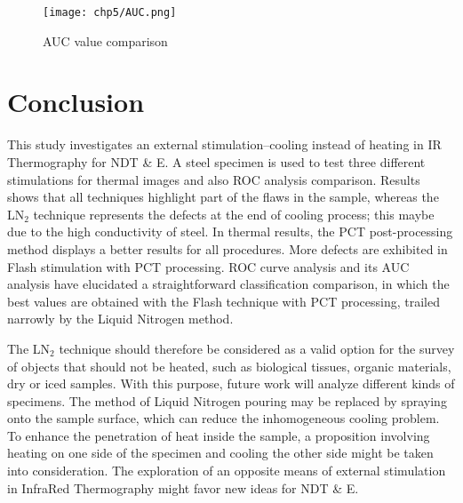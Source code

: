               
\begin{figure}[htpb]
   \centering
   \texttt{[image: chp5/AUC.png]}
   \caption{AUC value comparison}
   \label{fig_auc}
\end{figure}




\section{Conclusion} %
\label{sec:conclusion}
This study investigates an external stimulation--cooling instead of heating in IR Thermography for NDT \& E. 
A steel specimen is used to test three different stimulations for thermal images and also ROC analysis comparison. 
Results shows that all techniques highlight part of the flaws in the sample, whereas the LN$_2$ technique represents the defects at the end of cooling process; this maybe due to the high conductivity of steel. 
In thermal results, the PCT post-processing method displays a better results for all procedures. More defects are exhibited in Flash stimulation with PCT processing.
ROC curve analysis and its AUC analysis have elucidated a straightforward classification comparison, in which the best values are obtained with the Flash technique with PCT processing, trailed narrowly by the Liquid Nitrogen method.


The LN$_2$ technique should therefore be considered as a valid option for the survey of objects that should not be heated, such as biological tissues, organic materials, dry or iced samples. With this purpose, future work will analyze different kinds of specimens.
The method of Liquid Nitrogen pouring may be replaced by spraying onto the sample surface, which can reduce the inhomogeneous cooling problem. To enhance the penetration of heat inside the sample, a proposition involving heating on one side of the specimen and cooling the other side might be taken into consideration.
The exploration of an opposite means of external stimulation in InfraRed Thermography might favor new ideas 
for NDT \& E.


